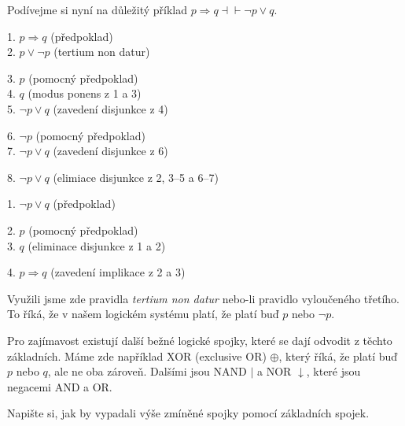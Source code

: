 \begin{example}
  Podívejme si nyní na důležitý příklad $p\Rightarrow q \dashv\vdash \neg p\lor q$. 
  \begin{proofbox}
    1. $p \Rightarrow q$ (předpoklad) \\
    2. $p \lor \neg p$ (tertium non datur) 
    \begin{proofbox}
      3. $p$ (pomocný předpoklad) \\
      4. $q$ (modus ponens z 1 a 3) \\
      5. $\neg p \lor q$ (zavedení disjunkce z 4)
    \end{proofbox}
    \begin{proofbox}
      6. $\neg p$ (pomocný předpoklad) \\
      7. $\neg p \lor q$ (zavedení disjunkce z 6)
    \end{proofbox}
    8. $\neg p \lor q$ (elimiace disjunkce z 2, 3--5 a 6--7)
  \end{proofbox}
  \begin{proofbox}
    1. $\neg p \lor q$ (předpoklad) 
    \begin{proofbox}
      2. $p$ (pomocný předpoklad) \\
      3. $q$ (eliminace disjunkce z 1 a 2) 
    \end{proofbox}
    4. $p \Rightarrow q$ (zavedení implikace z 2 a 3)
  \end{proofbox}
  Využili jsme zde pravidla \textit{tertium non datur} nebo-li pravidlo vyloučeného třetího. To říká, že v našem logickém systému platí, že platí buď $p$ nebo $\neg p$.
\end{example}

\begin{note}
  Pro zajímavost existují další bežné logické spojky, které se dají odvodit z těchto základních. Máme zde například XOR (exclusive OR) $\oplus$, který říká, že platí buď $p$ nebo $q$, ale ne oba zároveň. Dalšími jsou NAND $\mid$ a NOR $\downarrow$, které jsou negacemi AND a OR.\@ 
\end{note}

\begin{problem}
  Napište si, jak by vypadali výše zmíněné spojky pomocí základních spojek.
\end{problem}

